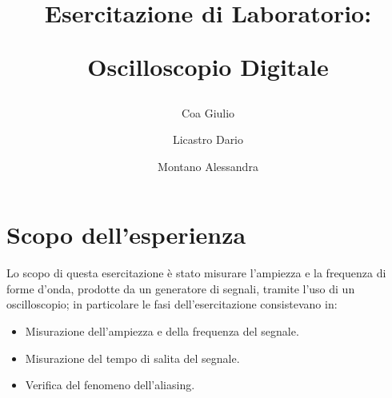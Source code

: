 \documentclass{article}
\title{
		\begin{center}
			Esercitazione di Laboratorio:
		\end{center}
		\newline
		\begin{center}
			Oscilloscopio Digitale
		\end{center}
	}
\author{
			Coa Giulio
			\and
			Licastro Dario
			\and
			Montano Alessandra
		}
\begin{document}
	\begin{titlingpage}
		\maketitle
	\end{titlingpage}
	\newpage
	\section{Scopo dell'esperienza}
		Lo scopo di questa esercitazione è stato misurare l'ampiezza e la frequenza di forme d’onda, prodotte da un generatore di segnali, tramite l’uso di un oscilloscopio; in particolare le fasi dell'esercitazione consistevano in:
		\begin{itemize}
			\item Misurazione dell'ampiezza e della frequenza del segnale.
			\item Misurazione del tempo di salita del segnale.
			\item Verifica del fenomeno dell’aliasing.
		\end{itemize}
\end{document}
